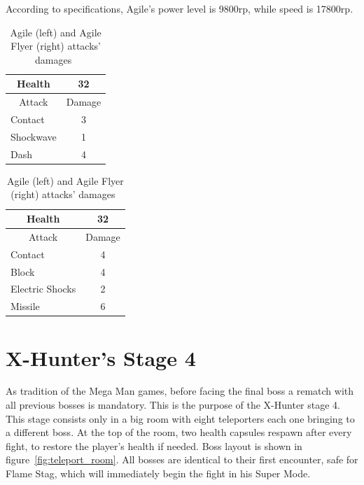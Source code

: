 According to specifications, Agile's power level is 9800rp, while speed is 17800rp.


\begin{table}[htp]
	\begin{minipage}{.45\linewidth}
		\centering
		\begin{tabular}[h]{l c }
			\toprule
			\multicolumn{1}{c}{Health}  & 32 \\
			\midrule
			\multicolumn{1}{c}{Attack} & \multicolumn{1}{c}{Damage}\\
			Contact & 3\\
			Shockwave& 1\\
			Dash& 4\\
			\bottomrule
		\end{tabular}
	\end{minipage}
	\begin{minipage}{.45\linewidth}
		\centering
		\begin{tabular}[h]{l c }
			\toprule
			\multicolumn{1}{c}{Health}  & 32 \\
			\midrule
			\multicolumn{1}{c}{Attack} & \multicolumn{1}{c}{Damage}\\
			Contact & 4 \\
			Block & 4\\
			Electric Shocks & 2\\
			Missile& 6\\
			\bottomrule
		\end{tabular}
	\end{minipage}
	\caption{Agile (left) and Agile Flyer (right) attacks' damages~\cite{wiki:Agile}}
\end{table}

\section{X-Hunter's Stage 4}
As tradition of the Mega Man games, before facing the final boss a rematch with all previous bosses is mandatory. This is the purpose of the X-Hunter stage 4. This stage consists only in a big room with eight teleporters each one bringing to a different boss. At the top of the room, two health capsules respawn after every fight, to restore the player's health if needed. Boss layout is shown in figure~\ref{fig:teleport_room}. All bosses are identical to their first encounter, safe for Flame Stag, which will immediately begin the fight in his Super Mode. 

